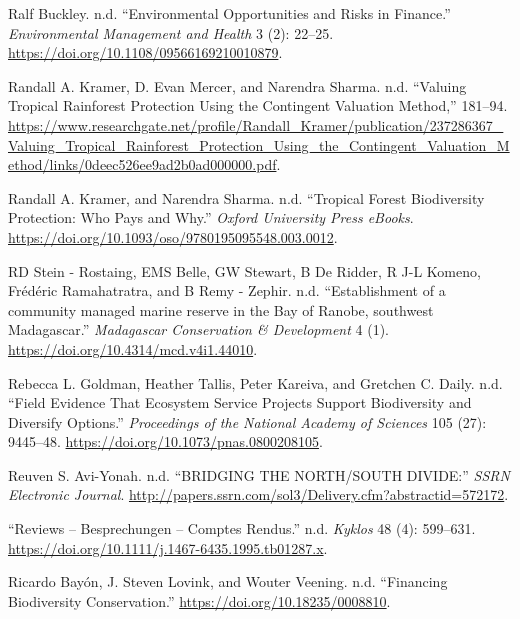 \begin{CSLReferences}{1}{0}
Ralf Buckley. n.d. {``Environmental Opportunities and Risks in
Finance.''} \emph{Environmental Management and Health} 3 (2): 22--25.
\url{https://doi.org/10.1108/09566169210010879}.

Randall A. Kramer, D. Evan Mercer, and Narendra Sharma. n.d. {``Valuing
Tropical Rainforest Protection Using the Contingent Valuation Method,''}
181--94.
\url{https://www.researchgate.net/profile/Randall_Kramer/publication/237286367_Valuing_Tropical_Rainforest_Protection_Using_the_Contingent_Valuation_Method/links/0deec526ee9ad2b0ad000000.pdf}.

Randall A. Kramer, and Narendra Sharma. n.d. {``Tropical Forest
Biodiversity Protection: Who Pays and Why.''} \emph{Oxford University
Press eBooks}. \url{https://doi.org/10.1093/oso/9780195095548.003.0012}.

RD Stein - Rostaing, EMS Belle, GW Stewart, B De Ridder, R J-L Komeno,
Frédéric Ramahatratra, and B Remy - Zephir. n.d. {``Establishment of a
community managed marine reserve in the Bay of Ranobe, southwest
Madagascar.''} \emph{Madagascar Conservation \& Development} 4 (1).
\url{https://doi.org/10.4314/mcd.v4i1.44010}.

Rebecca L. Goldman, Heather Tallis, Peter Kareiva, and Gretchen C.
Daily. n.d. {``Field Evidence That Ecosystem Service Projects Support
Biodiversity and Diversify Options.''} \emph{Proceedings of the National
Academy of Sciences} 105 (27): 9445--48.
\url{https://doi.org/10.1073/pnas.0800208105}.

Reuven S. Avi-Yonah. n.d. {``BRIDGING THE NORTH/SOUTH DIVIDE:''}
\emph{SSRN Electronic Journal}.
\url{http://papers.ssrn.com/sol3/Delivery.cfm?abstractid=572172}.

{``Reviews -- Besprechungen -- Comptes Rendus.''} n.d. \emph{Kyklos} 48
(4): 599--631. \url{https://doi.org/10.1111/j.1467-6435.1995.tb01287.x}.

Ricardo Bayón, J. Steven Lovink, and Wouter Veening. n.d. {``Financing
Biodiversity Conservation.''} \url{https://doi.org/10.18235/0008810}.


\end{CSLReferences}
